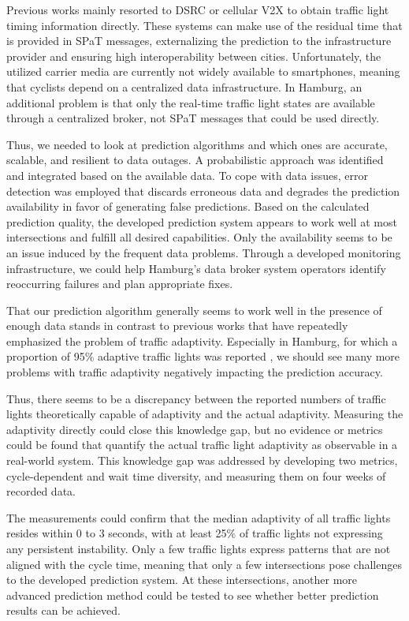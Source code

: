Previous works mainly resorted to DSRC or cellular V2X to obtain traffic light timing information directly. These systems can make use of the residual time that is provided in SPaT messages, externalizing the prediction to the infrastructure provider and ensuring high interoperability between cities. Unfortunately, the utilized carrier media are currently not widely available to smartphones, meaning that cyclists depend on a centralized data infrastructure. In Hamburg, an additional problem is that only the real-time traffic light states are available through a centralized broker, not SPaT messages that could be used directly. 

Thus, we needed to look at prediction algorithms and which ones are accurate, scalable, and resilient to data outages. A probabilistic approach was identified and integrated based on the available data. To cope with data issues, error detection was employed that discards erroneous data and degrades the prediction availability in favor of generating false predictions. Based on the calculated prediction quality, the developed prediction system appears to work well at most intersections and fulfill all desired capabilities. Only the availability seems to be an issue induced by the frequent data problems. Through a developed monitoring infrastructure, we could help Hamburg's data broker system operators identify reoccurring failures and plan appropriate fixes. 

That our prediction algorithm generally seems to work well in the presence of enough data stands in contrast to previous works that have repeatedly emphasized the problem of traffic adaptivity. Especially in Hamburg, for which a proportion of 95\% adaptive traffic lights was reported \cite{bodenheimer_enabling_2014}, we should see many more problems with traffic adaptivity negatively impacting the prediction accuracy. 

Thus, there seems to be a discrepancy between the reported numbers of traffic lights theoretically capable of adaptivity and the actual adaptivity. Measuring the adaptivity directly could close this knowledge gap, but no evidence or metrics could be found that quantify the actual traffic light adaptivity as observable in a real-world system. This knowledge gap was addressed by developing two metrics, cycle-dependent and wait time diversity, and measuring them on four weeks of recorded data.

The measurements could confirm that the median adaptivity of all traffic lights resides within 0 to 3 seconds, with at least 25\% of traffic lights not expressing any persistent instability. Only a few traffic lights express patterns that are not aligned with the cycle time, meaning that only a few intersections pose challenges to the developed prediction system. At these intersections, another more advanced prediction method could be tested to see whether better prediction results can be achieved.

